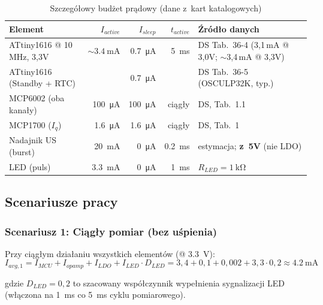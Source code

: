 \documentclass[a4paper,11pt]{article}
\begin{document}
	\begin{table}[H]
		\centering
		\caption{Szczegółowy budżet prądowy (dane z~kart katalogowych)}
		\label{tab:moc_detail}
		\begin{tabularx}{\textwidth}{l r r r X}
			\toprule
			\textbf{Element} & \textbf{$I_{active}$} & \textbf{$I_{sleep}$}
			& \textbf{$t_{active}$} & \textbf{Źródło danych} \\
			\midrule
			ATtiny1616 @ 10\,MHz, 3{,}3V
			& ${\sim}\SI{3,4}{\milli\ampere}$
			& \SI{0,7}{\micro\ampere}
			& \SI{5}{\milli\second}
			& DS Tab.~36-4 (3{,}1\,mA @ 3{,}0V; ${\sim}$3{,}4\,mA @ 3{,}3V) \\
			ATtiny1616 (Standby + RTC)
			&
			& \SI{0,7}{\micro\ampere}
			&
			& DS Tab.~36-5 (OSCULP32K, typ.) \\
			MCP6002 (oba kanały)
			& \SI{100}{\micro\ampere}
			& \SI{100}{\micro\ampere}
			& ciągły
			& DS, Tab.~1.1 \\
			MCP1700 ($I_q$)
			& \SI{1,6}{\micro\ampere}
			& \SI{1,6}{\micro\ampere}
			& ciągły
			& DS, Tab.~1 \\
			Nadajnik US (burst)
			& \SI{20}{\milli\ampere}
			& \SI{0}{\micro\ampere}
			& \SI{0,2}{\milli\second}
			& estymacja; \textbf{z~5V} (nie LDO) \\
			LED (puls)
			& \SI{3,3}{\milli\ampere}
			& \SI{0}{\micro\ampere}
			& \SI{1}{\milli\second}
			& $R_{LED} = \SI{1}{\kilo\ohm}$ \\
			\bottomrule
		\end{tabularx}
	\end{table}
	
	\subsection{Scenariusze pracy}
	
	\subsubsection{Scenariusz 1: Ciągły pomiar (bez uśpienia)}
	
	Przy ciągłym działaniu wszystkich elementów (@ \SI{3,3}{\volt}):
	\begin{equation}
		I_{avg,1} = I_{MCU} + I_{opamp} + I_{LDO} + I_{LED} \cdot D_{LED}
		= 3{,}4 + 0{,}1 + 0{,}002 + 3{,}3 \cdot 0{,}2 \approx \SI{4,2}{\milli\ampere}
	\end{equation}
	
	gdzie $D_{LED} = 0{,}2$ to szacowany współczynnik wypełnienia sygnalizacji LED
	(włączona na \SI{1}{\milli\second} co \SI{5}{\milli\second} cyklu pomiarowego).
	
\end{document}
